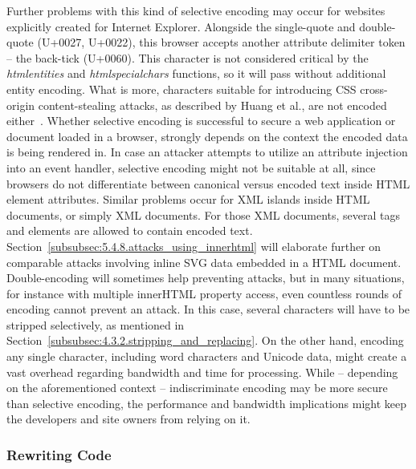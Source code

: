     Further problems with this kind of selective encoding may occur for websites explicitly created for Internet Explorer. Alongside the single-quote and double-quote (U+0027, U+0022), this browser accepts another attribute delimiter token -- the back-tick (U+0060). This character is not considered critical by the \textit{htmlentities} and \textit{htmlspecialchars} functions, so it will pass without additional entity encoding. What is more, characters suitable for introducing CSS cross-origin content-stealing attacks, as described by Huang et al., are not encoded either~\cite{huang_protecting_2010}. Whether selective encoding is successful to secure a web application or document loaded in a browser, strongly depends on the context the encoded data is being rendered in. In case an attacker attempts to utilize an attribute injection into an event handler, selective encoding might not be suitable at all, since browsers do not differentiate between canonical versus encoded text inside HTML element attributes. 
Similar problems occur for XML islands inside HTML documents, or simply XML documents. For those XML documents, several tags and elements are allowed to contain encoded text. Section~\ref{subsubsec:5.4.8.attacks_using_innerhtml} will elaborate further on comparable attacks involving inline SVG data embedded in a HTML document. Double-encoding will sometimes help preventing attacks, but in many situations, for instance with multiple innerHTML property access, even countless rounds of encoding cannot prevent an attack. In this case, several characters will have to be stripped selectively, as mentioned in Section~\ref{subsubsec:4.3.2.stripping_and_replacing}. On the other hand, encoding any single character, including word characters and Unicode data, might create a vast overhead regarding bandwidth and time for processing. While -- depending on the aforementioned context -- indiscriminate encoding may be more secure than selective encoding, the performance and bandwidth implications might keep the developers 
and site owners from relying on it. \\

    \subsubsection{Rewriting Code}
    \label{subsubsec:4.3.5.rewriting_code}

